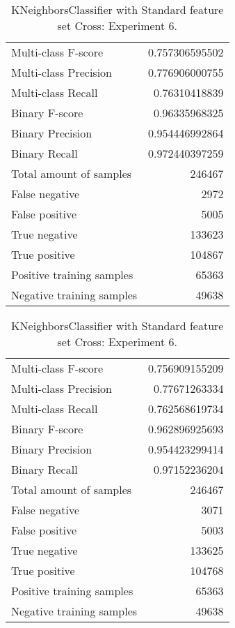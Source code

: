 \begin{table}[H]
\begin{minipage}{0.5\textwidth}
\caption{KNeighborsClassifier with Standard feature set Cross: Experiment 5.}
\centering
\begin{tabular}{l r}
\toprule
Multi-class F-score & 0.757306595502 \\
Multi-class Precision & 0.776906000755 \\
Multi-class Recall & 0.76310418839 \\
\midrule
Binary F-score & 0.96335968325 \\
Binary Precision & 0.954446992864 \\
Binary Recall & 0.972440397259 \\
\midrule
Total amount of samples & 246467 \\
False negative & 2972 \\
False positive & 5005 \\
True negative & 133623 \\
True positive & 104867 \\
\midrule
Positive training samples & 65363 \\
Negative training samples & 49638 \\
\bottomrule
\end{tabular}
\end{minipage}
\hfillx
\begin{minipage}{0.5\textwidth}
\caption{KNeighborsClassifier with Standard feature set Cross: Experiment 6.}
\centering
\begin{tabular}{l r}
\toprule
Multi-class F-score & 0.756909155209 \\
Multi-class Precision & 0.77671263334 \\
Multi-class Recall & 0.762568619734 \\
\midrule
Binary F-score & 0.962896925693 \\
Binary Precision & 0.954423299414 \\
Binary Recall & 0.97152236204 \\
\midrule
Total amount of samples & 246467 \\
False negative & 3071 \\
False positive & 5003 \\
True negative & 133625 \\
True positive & 104768 \\
\midrule
Positive training samples & 65363 \\
Negative training samples & 49638 \\
\bottomrule
\end{tabular}
\end{minipage}
\end{table}
